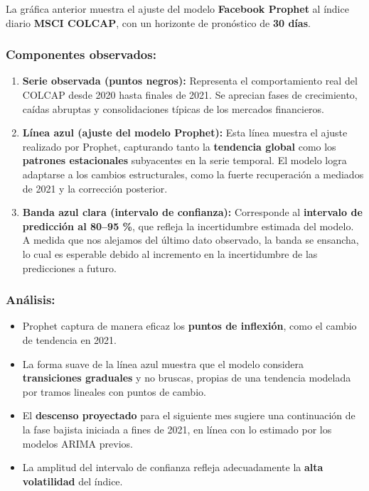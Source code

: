 \documentclass[
  11pt,
]{book}
\providecommand{\tightlist}{%
  \setlength{\itemsep}{0pt}\setlength{\parskip}{0pt}}
\begin{document}
La gráfica anterior muestra el ajuste del modelo \textbf{Facebook Prophet} al índice diario \textbf{MSCI COLCAP}, con un horizonte de pronóstico de \textbf{30 días}.

\subsubsection{Componentes observados:}\label{componentes-observados}

\begin{enumerate}
\def\labelenumi{\arabic{enumi}.}
\item
  \textbf{Serie observada (puntos negros):}
  Representa el comportamiento real del COLCAP desde 2020 hasta finales de 2021. Se aprecian fases de crecimiento, caídas abruptas y consolidaciones típicas de los mercados financieros.
\item
  \textbf{Línea azul (ajuste del modelo Prophet):}
  Esta línea muestra el ajuste realizado por Prophet, capturando tanto la \textbf{tendencia global} como los \textbf{patrones estacionales} subyacentes en la serie temporal. El modelo logra adaptarse a los cambios estructurales, como la fuerte recuperación a mediados de 2021 y la corrección posterior.
\item
  \textbf{Banda azul clara (intervalo de confianza):}
  Corresponde al \textbf{intervalo de predicción al 80--95 \%}, que refleja la incertidumbre estimada del modelo. A medida que nos alejamos del último dato observado, la banda se ensancha, lo cual es esperable debido al incremento en la incertidumbre de las predicciones a futuro.
\end{enumerate}

\subsubsection{Análisis:}\label{anuxe1lisis}

\begin{itemize}
\tightlist
\item
  Prophet captura de manera eficaz los \textbf{puntos de inflexión}, como el cambio de tendencia en 2021.
\item
  La forma suave de la línea azul muestra que el modelo considera \textbf{transiciones graduales} y no bruscas, propias de una tendencia modelada por tramos lineales con puntos de cambio.
\item
  El \textbf{descenso proyectado} para el siguiente mes sugiere una continuación de la fase bajista iniciada a fines de 2021, en línea con lo estimado por los modelos ARIMA previos.
\item
  La amplitud del intervalo de confianza refleja adecuadamente la \textbf{alta volatilidad} del índice.
\end{itemize}
\end{document}
